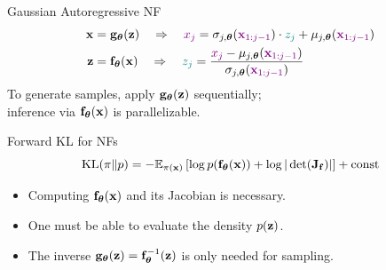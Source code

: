 \documentclass{beamer}
\begin{document}
\begin{frame}{Gaussian Autoregressive NF}
	\vspace{-0.5cm}
	\begin{align*}
		\mathbf{x} &= \mathbf{g}_{\boldsymbol{\theta}}(\mathbf{z}) \quad \Rightarrow \quad {\color{violet} x_j} = \sigma_{j, \boldsymbol{\theta}} ({\color{violet} \mathbf{x}_{1:j-1}}) \cdot {\color{teal} z_j} + \mu_{j, \boldsymbol{\theta}}({\color{violet} \mathbf{x}_{1:j-1}}) \\
		\mathbf{z} &= \mathbf{f}_{\boldsymbol{\theta}}(\mathbf{x}) \quad \Rightarrow \quad {\color{teal} z_j} = \frac{{\color{violet}x_j} - \mu_{j, \boldsymbol{\theta}}({\color{violet}\mathbf{x}_{1:j-1}})}{ \sigma_{j, \boldsymbol{\theta}} ({\color{violet}\mathbf{x}_{1:j-1}})}
	\end{align*}
	\eqpause
	To generate samples, apply $\mathbf{g}_{\boldsymbol{\theta}}(\mathbf{z})$ sequentially;\\
	inference via $\mathbf{f}_{\boldsymbol{\theta}}(\mathbf{x})$ is parallelizable.
	\eqpause

	\begin{block}{Forward KL for NFs}
		\vspace{-0.2cm}
		\[
			\mathrm{KL}(\pi \| p)  = -\mathbb{E}_{\pi(\mathbf{x})} \left[\log p(\mathbf{f}_{\boldsymbol{\theta}}(\mathbf{x})) + \log  |\det (\mathbf{J}_{\mathbf{f}})|\right] + \text{const}
		\]
		\vspace{-0.5cm}
		\eqpause
		\begin{itemize}
			\item Computing $\mathbf{f}_{\boldsymbol{\theta}}(\mathbf{x})$ and its Jacobian is necessary.
			\item One must be able to evaluate the density $p(\mathbf{z})$.
			\item The inverse $\mathbf{g}_{\boldsymbol{\theta}}(\mathbf{z}) = \mathbf{f}_{\boldsymbol{\theta}}^{-1}(\mathbf{z})$ is only needed for sampling.
		\end{itemize}
	\end{block}
\end{frame}
\end{document}

